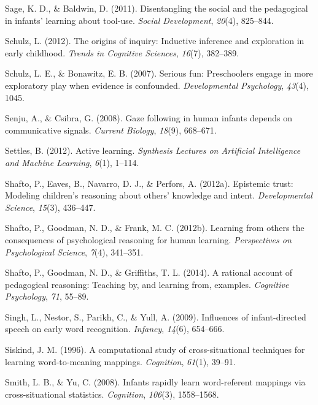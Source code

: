 \documentclass[english,floatsintext,man]{apa6}
\theoremstyle{definition}
\theoremstyle{definition}
\theoremstyle{definition}
\theoremstyle{remark}
\begin{document}
\hypertarget{ref-sage2011disentangling}{}
Sage, K. D., \& Baldwin, D. (2011). Disentangling the social and the
pedagogical in infants' learning about tool-use. \emph{Social
Development}, \emph{20}(4), 825--844.

\hypertarget{ref-schulz2012origins}{}
Schulz, L. (2012). The origins of inquiry: Inductive inference and
exploration in early childhood. \emph{Trends in Cognitive Sciences},
\emph{16}(7), 382--389.

\hypertarget{ref-schulz2007serious}{}
Schulz, L. E., \& Bonawitz, E. B. (2007). Serious fun: Preschoolers
engage in more exploratory play when evidence is confounded.
\emph{Developmental Psychology}, \emph{43}(4), 1045.

\hypertarget{ref-senju2008gaze}{}
Senju, A., \& Csibra, G. (2008). Gaze following in human infants depends
on communicative signals. \emph{Current Biology}, \emph{18}(9),
668--671.

\hypertarget{ref-settles2012active}{}
Settles, B. (2012). Active learning. \emph{Synthesis Lectures on
Artificial Intelligence and Machine Learning}, \emph{6}(1), 1--114.

\hypertarget{ref-shafto2012epistemic}{}
Shafto, P., Eaves, B., Navarro, D. J., \& Perfors, A. (2012a). Epistemic
trust: Modeling children's reasoning about others' knowledge and intent.
\emph{Developmental Science}, \emph{15}(3), 436--447.

\hypertarget{ref-shafto2012learning}{}
Shafto, P., Goodman, N. D., \& Frank, M. C. (2012b). Learning from
others the consequences of psychological reasoning for human learning.
\emph{Perspectives on Psychological Science}, \emph{7}(4), 341--351.

\hypertarget{ref-shafto2014rational}{}
Shafto, P., Goodman, N. D., \& Griffiths, T. L. (2014). A rational
account of pedagogical reasoning: Teaching by, and learning from,
examples. \emph{Cognitive Psychology}, \emph{71}, 55--89.

\hypertarget{ref-singh2009influences}{}
Singh, L., Nestor, S., Parikh, C., \& Yull, A. (2009). Influences of
infant-directed speech on early word recognition. \emph{Infancy},
\emph{14}(6), 654--666.

\hypertarget{ref-siskind1996computational}{}
Siskind, J. M. (1996). A computational study of cross-situational
techniques for learning word-to-meaning mappings. \emph{Cognition},
\emph{61}(1), 39--91.

\hypertarget{ref-smith2008infants}{}
Smith, L. B., \& Yu, C. (2008). Infants rapidly learn word-referent
mappings via cross-situational statistics. \emph{Cognition},
\emph{106}(3), 1558--1568.
\end{document}
